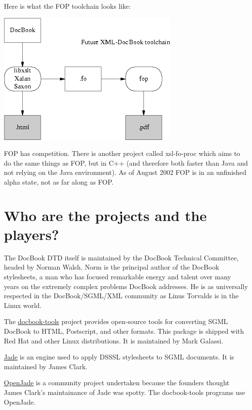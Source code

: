 \documentclass[pdftex,english,a4paper,10pt]{infocom}
\begin{document}
Here is what the FOP toolchain looks like:

{{\includegraphics[]{figure3.png}}}

FOP has competition.  There is another project called
xsl-fo-proc
which aims to do the same things as FOP, but in C++ (and therefore
both faster than Java and not relying on the Java environment).  As of
August 2002 FOP is in an unfinished alpha state, not as far along as
FOP.

\section{Who are the projects and the players?}
\label{id177094}\hypertarget{id177094}{}%

The DocBook DTD itself is maintained by the DocBook Technical
Committee, headed by Norman Walsh.  Norm is the principal author of
the DocBook stylesheets, a man who has focused remarkable energy and
talent over many years on the extremely complex problems DocBook
addresses.  He is as universally respected in the DocBook/SGML/XML
community as Linus Torvalds is in the Linux world.

The \href{http://sources.redhat.com/docbook-tools/}{
docbook-tools} project provides open-source tools for
converting SGML DocBook to HTML, Postscript, and other formats.  This
package is shipped with Red Hat and other Linux distributions.  It is
maintained by Mark Galassi.

\href{http://www.jclark.com/jade/}{Jade} is an
engine used to apply DSSSL stylesheets to SGML documents.  It is
maintained by James Clark.

\href{http://openjade.sourceforge.net/}{OpenJade}
is a community project undertaken because the founders thought James
Clark's maintainance of Jade was spotty. The docbook-tools programs
use OpenJade.
\end{document}

